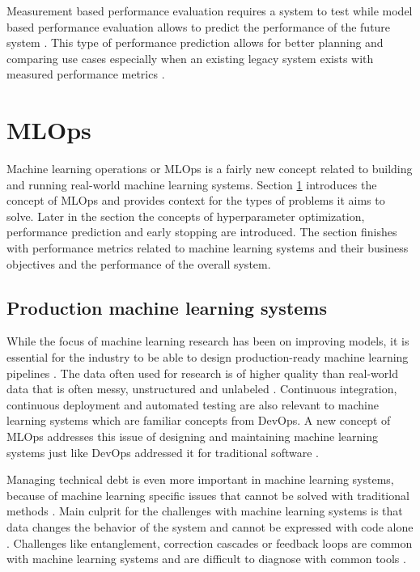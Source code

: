 Measurement based performance evaluation requires a system to test while model based performance evaluation allows to predict the performance of the future system \parencite{brunnertPerformanceorientedDevOpsResearch2015}. This type of performance prediction allows for better planning and comparing use cases especially when an existing legacy system exists with measured performance metrics \parencite{brunnertPerformanceorientedDevOpsResearch2015}.

\section{MLOps} %
\label{sec:mldevops}

Machine learning operations or MLOps is a fairly new concept related to building and running real-world machine learning systems. Section \ref{sec:mldevops} introduces the concept of MLOps and provides context for the types of problems it aims to solve. Later in the section the concepts of hyperparameter optimization, performance prediction and early stopping are introduced. The section finishes with performance metrics related to machine learning systems and their business objectives and the performance of the overall system.

\subsection{Production machine learning systems}

While the focus of machine learning research has been on improving models, it is essential for the industry to be able to design production-ready machine learning pipelines \parencite{posoldovaMachineLearningPipelines2020}. The data often used for research is of higher quality than real-world data that is often messy, unstructured and unlabeled \parencite{posoldovaMachineLearningPipelines2020}. Continuous integration, continuous deployment and automated testing are also relevant to machine learning systems \parencite{posoldovaMachineLearningPipelines2020} which are familiar concepts from DevOps. A new concept of MLOps addresses this issue of designing and maintaining machine learning systems just like DevOps addressed it for traditional software \parencite{kreuzbergerMachineLearningOperations2023}.

Managing technical debt is even more important in machine learning systems, because of machine learning specific issues that cannot be solved with traditional methods \parencite{sculleyHiddenTechnicalDebt2015a}. Main culprit for the challenges with machine learning systems is that data changes the behavior of the system and cannot be expressed with code alone \parencite{sculleyHiddenTechnicalDebt2015a}. Challenges like entanglement, correction cascades or feedback loops are common with machine learning systems and are difficult to diagnose with common tools \parencite{sculleyHiddenTechnicalDebt2015a}.

